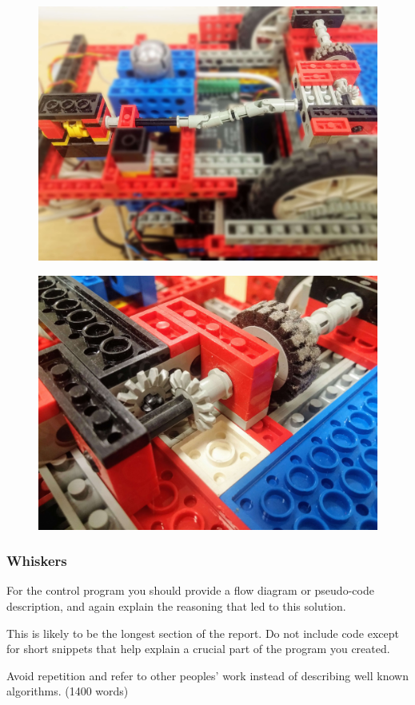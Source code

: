 \begin{figure}[ht]
    \centering
    \includegraphics[width=0.7\linewidth]{res/robot-pics/pivot-wheel-sensor.jpg}
    \caption{}
    \label{fig:}
\end{figure}

\begin{figure}[ht]
    \centering
    \includegraphics[width=0.7\linewidth]{res/robot-pics/pivot-wheel-axel-transfer.jpg}
    \caption{}
    \label{fig:}
\end{figure}

\subsubsection{Whiskers}
\label{sec:whiskers}


For the control program you should provide a flow diagram or pseudo-code description, and again explain the reasoning that led to this solution.

This is likely to be the longest section of the report. Do not include code except for short snippets that help explain a crucial part of the program you created.

Avoid repetition and refer to other peoples' work instead of describing well known algorithms. (1400 words)

\newpage

